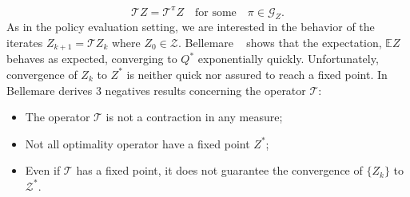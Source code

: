 \begin{equation}
	\mathcal{T}Z=\mathcal{T}^\pi Z \quad \text{for some} \quad \pi \in \mathcal{G}_{Z}.
\end{equation}
 As in the policy evaluation setting, we are interested in the behavior of the iterates $Z_{k+1}= \mathcal{T}Z_k$ where $Z_0 \in \mathcal{Z}$. Bellemare ~\cite{DBLP:journals/corr/BellemareDM17} shows that the expectation, $\mathbb{E}Z$ behaves as expected, converging to $Q^*$ exponentially quickly. Unfortunately, convergence of $Z_k$ to $Z^*$ is neither quick nor assured to reach a fixed point. In Bellemare derives 3 negatives results concerning the operator $\mathcal{T}$:
 \begin{itemize}
 	\item The operator $\mathcal{T}$ is not a contraction in any measure;
 	\item Not all optimality operator have a fixed point $Z^*$;
 	\item Even if $\mathcal{T}$ has a fixed point, it does not guarantee the convergence of $\lbrace Z_k\rbrace$ to $\mathcal{Z^*}$.
 \end{itemize}